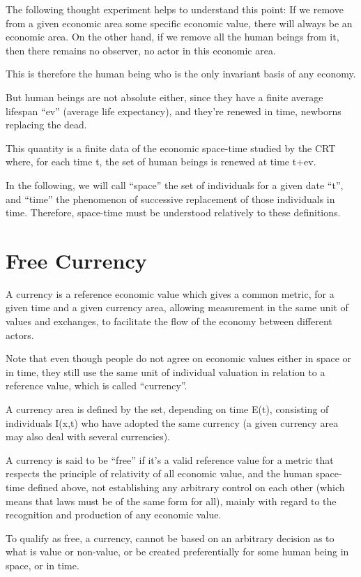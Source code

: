 \documentclass[a4paper,oneside,12pt]{article}
\begin{document}
The following thought experiment helps to understand this point: If we
remove from a given economic area some specific economic value, there
will always be an economic area.  On the other hand, if we remove all
the human beings from it, then there remains no observer, no actor in
this economic area.

This is therefore the human being who is the only invariant basis of
any economy.

But human beings are not absolute either, since they have a finite
average lifespan ``ev'' (average life expectancy), and they're
renewed in time, newborns replacing the dead.

This quantity is a finite data of the economic space-time studied by
the CRT where, for each time t, the set of human beings is renewed at
time t+ev.

In the following, we will call ``space'' the set of individuals for a
given date ``t'', and ``time'' the phenomenon of successive
replacement of those individuals in time.  Therefore, space-time must
be understood relatively to these definitions.

\section{Free Currency}

A currency is a reference economic value which gives a common metric,
for a given time and a given currency area, allowing measurement in the
same unit of values and exchanges, to facilitate the flow of the
economy between different actors.

Note that even though people do not agree on economic values either in
space or in time, they still use the same unit of individual valuation
in relation to a reference value, which is called ``currency''.

A currency area is defined by the set, depending on time E(t),
consisting of individuals I(x,t) who have adopted the same currency
(a given currency area may also deal with several currencies).

A currency is said to be ``free'' if it's a valid reference value for
a metric that respects the principle of relativity of all economic
value, and the human space-time defined above, not establishing any
arbitrary control on each other (which means that laws must be of the
same form for all), mainly with regard to the recognition and
production of any economic value.


To qualify as free, a currency, cannot be based on an arbitrary
decision as to what is value or non-value, or be created
preferentially for some human being in space, or in time.
\end{document}
